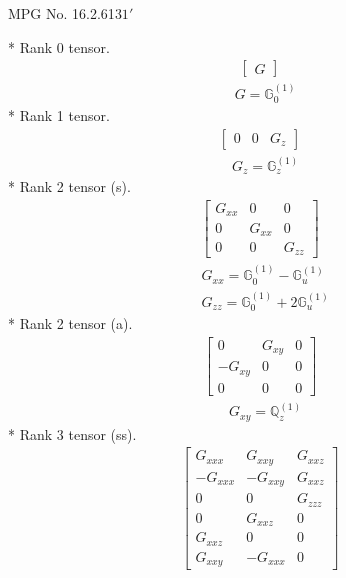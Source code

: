 \documentclass[fleqn,8pt,landscape]{jsarticle}
\begin{document}
\setcounter{MaxMatrixCols}{32}

\renewcommand{\tablename}{Table~}
\renewcommand{\figurename}{Figure~}
\begin{center}
\LARGE
MPG No. 16.2.61\quad$31'$
\end{center}
* Rank 0 tensor.
\begin{align*}
\begin{bmatrix} G \end{bmatrix}
\end{align*}
\begin{align*}
& G = \mathbb{G}_{0}^{(1)}
\end{align*}
* Rank 1 tensor.
\begin{align*}
\begin{bmatrix} 0 & 0 & G_{z} \end{bmatrix}
\end{align*}
\begin{align*}
& G_{z} = \mathbb{G}_{z}^{(1)}
\end{align*}
* Rank 2 tensor (s).
\begin{align*}
\begin{bmatrix} G_{xx} & 0 & 0 \\ 0 & G_{xx} & 0 \\ 0 & 0 & G_{zz} \end{bmatrix}
\end{align*}
\begin{align*}
& G_{xx} = \mathbb{G}_{0}^{(1)} - \mathbb{G}_{u}^{(1)} \\
& G_{zz} = \mathbb{G}_{0}^{(1)} + 2 \mathbb{G}_{u}^{(1)}
\end{align*}
* Rank 2 tensor (a).
\begin{align*}
\begin{bmatrix} 0 & G_{xy} & 0 \\ - G_{xy} & 0 & 0 \\ 0 & 0 & 0 \end{bmatrix}
\end{align*}
\begin{align*}
& G_{xy} = \mathbb{Q}_{z}^{(1)}
\end{align*}
* Rank 3 tensor (ss).
\begin{align*}
\begin{bmatrix} G_{xxx} & G_{xxy} & G_{xxz} \\ - G_{xxx} & - G_{xxy} & G_{xxz} \\ 0 & 0 & G_{zzz} \\ 0 & G_{xxz} & 0 \\ G_{xxz} & 0 & 0 \\ G_{xxy} & - G_{xxx} & 0 \end{bmatrix}
\end{align*}
\end{document}
